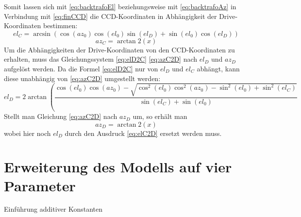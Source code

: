 Somit lassen sich mit \ref{eq:backtrafoEl} beziehungsweise mit \ref{eq:backtrafoAz} in Verbindung mit \ref{eq:finCCD} die CCD-Koordinaten in Abhängigkeit der Drive-Koordinaten bestimmen:
\begin{equation}
el_C=\arcsin\left(\cos(az_0)\cos(el_0)\sin(el_D)+\sin(el_0)\cos(el_D)\right)
\label{eq:elD2C}
\end{equation}
\begin{equation}
az_C=\arctan2(x)
\label{eq:azC2D}
\end{equation}
Um die Abhängigkeiten der Drive-Koordinaten von den CCD-Koordinaten zu erhalten, muss das Gleichungssystem \ref{eq:elD2C} \ref{eq:azC2D} nach $el_D$ und $az_D$ aufgelöst werden. Da die Formel \ref{eq:elD2C} nur von $el_D$ und $el_C$ abhängt, kann diese unabhängig von \ref{eq:azC2D} umgestellt werden:
\begin{equation}
el_D=2\arctan\left(\frac{\cos(el_0)\cos(az_0)-\sqrt{\cos^2(el_0)\cos^2(az_0)-\sin^2(el_0)+\sin^2(el_C)}}{\sin(el_C)+\sin(el_0)}
\label{eq:elC2D}
\end{equation}
Stellt man Gleichung \ref{eq:azC2D} nach $az_D$ um, so erhält man
\begin{equation}
az_D=\arctan2\left( x \right)
\label{eq:azC2D}
\end{equation}
wobei hier noch $el_D$ durch den Ausdruck \ref{eq:elC2D} ersetzt werden muss.

\section{Erweiterung des Modells auf vier Parameter}
Einführung additiver Konstanten